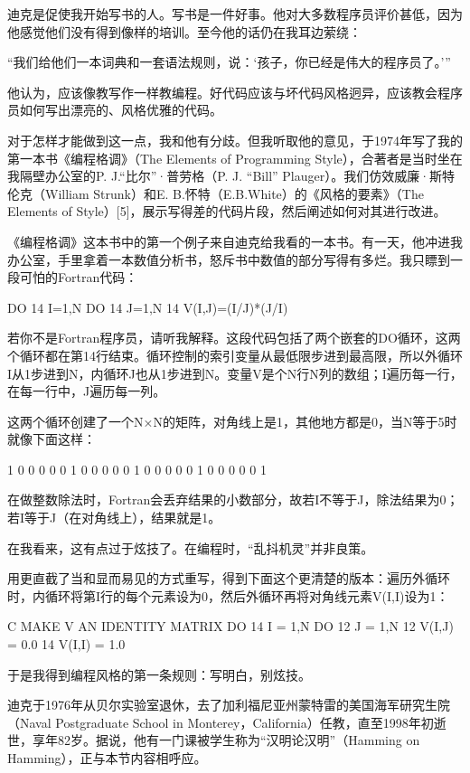 \documentclass[a4paper,12pt,UTF8,twoside]{ctexbook}
\begin{document}
迪克是促使我开始写书的人。写书是一件好事。他对大多数程序员评价甚低，因为他感觉他们没有得到像样的培训。至今他的话仍在我耳边萦绕：

“我们给他们一本词典和一套语法规则，说：‘孩子，你已经是伟大的程序员了。’”



他认为，应该像教写作一样教编程。好代码应该与坏代码风格迥异，应该教会程序员如何写出漂亮的、风格优雅的代码。

对于怎样才能做到这一点，我和他有分歧。但我听取他的意见，于1974年写了我的第一本书《编程格调》（The Elements of Programming Style），合著者是当时坐在我隔壁办公室的P. J.“比尔”·普劳格（P. J. “Bill” Plauger）。我们仿效威廉·斯特伦克（William Strunk）和E. B.怀特（E.B.White）的《风格的要素》（The Elements of Style）[5]，展示写得差的代码片段，然后阐述如何对其进行改进。

《编程格调》这本书中的第一个例子来自迪克给我看的一本书。有一天，他冲进我办公室，手里拿着一本数值分析书，怒斥书中数值的部分写得有多烂。我只瞟到一段可怕的Fortran代码：

DO 14 I=1,N DO 14 J=1,N 14 V(I,J)=(I/J)*(J/I)

若你不是Fortran程序员，请听我解释。这段代码包括了两个嵌套的DO循环，这两个循环都在第14行结束。循环控制的索引变量从最低限步进到最高限，所以外循环I从1步进到N，内循环J也从1步进到N。变量V是个N行N列的数组；I遍历每一行，在每一行中，J遍历每一列。

这两个循环创建了一个N×N的矩阵，对角线上是1，其他地方都是0，当N等于5时就像下面这样：

1 0 0 0 0 0 1 0 0 0 0 0 1 0 0 0 0 0 1 0 0 0 0 0 1

在做整数除法时，Fortran会丢弃结果的小数部分，故若I不等于J，除法结果为0；若I等于J（在对角线上），结果就是1。

在我看来，这有点过于炫技了。在编程时，“乱抖机灵”并非良策。

用更直截了当和显而易见的方式重写，得到下面这个更清楚的版本：遍历外循环时，内循环将第I行的每个元素设为0，然后外循环再将对角线元素V(I,I)设为1：

C MAKE V AN IDENTITY MATRIX DO 14 I = 1,N DO 12 J = 1,N 12 V(I,J) = 0.0 14 V(I,I) = 1.0

于是我得到编程风格的第一条规则：写明白，别炫技。

迪克于1976年从贝尔实验室退休，去了加利福尼亚州蒙特雷的美国海军研究生院（Naval Postgraduate School in Monterey，California）任教，直至1998年初逝世，享年82岁。据说，他有一门课被学生称为“汉明论汉明”（Hamming on Hamming），正与本节内容相呼应。
\end{document}
